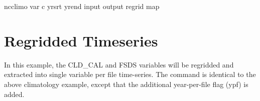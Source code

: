 \documentclass[letterpaper,10pt,english]{sphinxmanual}
\begin{document}
\begin{sphinxVerbatim}[commandchars=\\\{\}]
ncclimo 
   
  \PYGZhy{}\PYGZhy{}var 
  \PYGZhy{}c  
  \PYGZhy{}\PYGZhy{}yr\PYGZus{}srt 
  \PYGZhy{}\PYGZhy{}yr\PYGZus{}end 
  \PYGZhy{}\PYGZhy{}input 
  \PYGZhy{}\PYGZhy{}output 
  \PYGZhy{}\PYGZhy{}regrid
  \PYGZhy{}\PYGZhy{}map
\end{sphinxVerbatim}


\section{Regridded Timeseries}
\label{\detokenize{atm_regrid:regridded-timeseries}}
In this example, the CLD\_CAL and FSDS variables will be regridded and extracted into single variable per file time-series. The command is identical to the
above climatology example, except that the additional year-per-file flag (\textendash{}ypf) is added.
\end{document}
